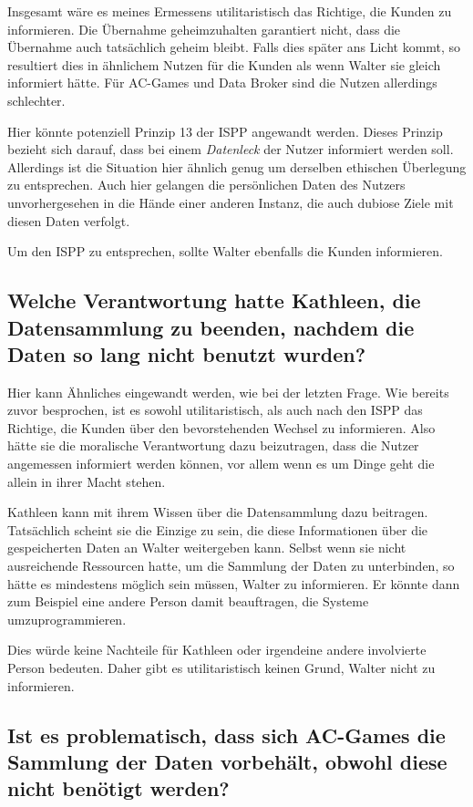 Insgesamt wäre es meines Ermessens utilitaristisch das Richtige, die Kunden zu informieren.
Die Übernahme geheimzuhalten garantiert nicht, dass die Übernahme auch tatsächlich geheim bleibt.
Falls dies später ans Licht kommt, so resultiert dies in ähnlichem Nutzen für die Kunden als wenn Walter sie gleich informiert hätte.
Für AC-Games und Data Broker sind die Nutzen allerdings schlechter.

Hier könnte potenziell Prinzip 13 der ISPP angewandt werden. Dieses Prinzip bezieht sich darauf, dass bei einem \emph{Datenleck} der Nutzer informiert werden soll. Allerdings ist die Situation hier ähnlich genug um derselben ethischen Überlegung zu entsprechen.
Auch hier gelangen die persönlichen Daten des Nutzers unvorhergesehen in die Hände einer anderen Instanz, die auch dubiose Ziele mit diesen Daten verfolgt.

Um den ISPP zu entsprechen, sollte Walter ebenfalls die Kunden informieren.

\subsection{Welche Verantwortung hatte Kathleen, die Datensammlung zu beenden, nachdem die Daten so lang nicht benutzt wurden? \cite{kees_faites_2017}}

Hier kann Ähnliches eingewandt werden, wie bei der letzten Frage.
Wie bereits zuvor besprochen, ist es sowohl utilitaristisch, als auch nach den ISPP das Richtige, die Kunden über den bevorstehenden Wechsel zu informieren.
Also hätte sie die moralische Verantwortung dazu beizutragen, dass die Nutzer angemessen informiert werden können, vor allem wenn es um Dinge geht die allein in ihrer Macht stehen.

Kathleen kann mit ihrem Wissen über die Datensammlung dazu beitragen.
Tatsächlich scheint sie die Einzige zu sein, die diese Informationen über die gespeicherten Daten an Walter weitergeben kann.
Selbst wenn sie nicht ausreichende Ressourcen hatte, um die Sammlung der Daten zu unterbinden, so hätte es mindestens möglich sein müssen, Walter zu informieren.
Er könnte dann zum Beispiel eine andere Person damit beauftragen, die Systeme umzuprogrammieren.

Dies würde keine Nachteile für Kathleen oder irgendeine andere involvierte Person bedeuten. 
Daher gibt es utilitaristisch keinen Grund, Walter nicht zu informieren.

\subsection{Ist es problematisch, dass sich AC-Games die Sammlung der Daten vorbehält, obwohl diese nicht benötigt werden?}

